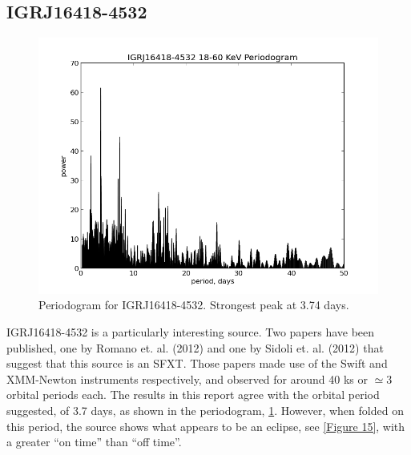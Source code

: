 \clearpage

\subsection{IGRJ16418-4532}

\begin{figure}[h!]
\centering
\includegraphics[width=130mm]{gfx/Fig14.png}
\caption{Periodogram for IGRJ16418-4532. Strongest peak at 3.74 days.}
\label{Figure 14}
\end{figure} 

IGRJ16418-4532 is a particularly interesting source. Two papers have been published, one by Romano et. al. (2012)\cite{Romano} and one by Sidoli et. al. (2012)\cite{Sidoli} that suggest that this source is an SFXT. Those papers made use of the Swift and XMM-Newton instruments respectively, and observed for around 40 ks or $\simeq3$ orbital periods each. The results in this report agree with the orbital period suggested, of 3.7 days, as shown in the periodogram, \ref{Figure 14}. However, when folded on this period, the source shows what appears to be an eclipse, see \ref{Figure 15}, with a greater \textquotedblleft{}on time\textquotedblright{} than \textquotedblleft{}off time\textquotedblright{}. 

